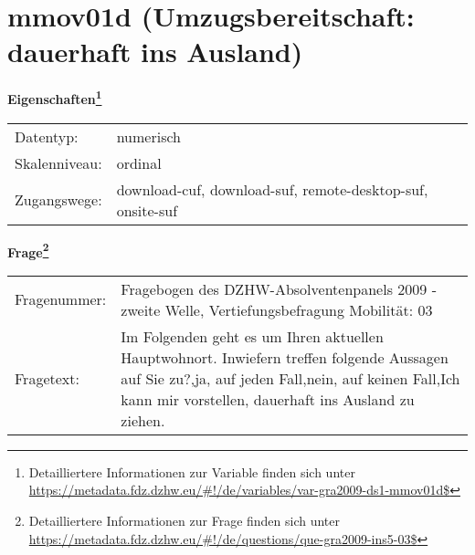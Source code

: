 
    \setcounter{footnote}{0}

    \vspace*{-1.8cm}
	\section{mmov01d (Umzugsbereitschaft: dauerhaft ins Ausland)}
	\label{section:mmov01d}



    \vspace*{0.5cm}
    \noindent\textbf{Eigenschaften\footnote{Detailliertere Informationen zur Variable finden sich unter
		\url{https://metadata.fdz.dzhw.eu/\#!/de/variables/var-gra2009-ds1-mmov01d$}}}\\
	\begin{tabularx}{\hsize}{@{}lX}
	Datentyp: & numerisch \\
	Skalenniveau: & ordinal \\
	Zugangswege: &
	  download-cuf, 
	  download-suf, 
	  remote-desktop-suf, 
	  onsite-suf
 \\
    \end{tabularx}



				\vspace*{0.5cm}
                \noindent\textbf{Frage\footnote{Detailliertere Informationen zur Frage finden sich unter
		              \url{https://metadata.fdz.dzhw.eu/\#!/de/questions/que-gra2009-ins5-03$}}}\\
				\begin{tabularx}{\hsize}{@{}lX}
					Fragenummer: &
					  Fragebogen des DZHW-Absolventenpanels 2009 - zweite Welle, Vertiefungsbefragung Mobilität:
					  03
 \\
					Fragetext: & Im Folgenden geht es um Ihren aktuellen Hauptwohnort. Inwiefern treffen folgende Aussagen auf Sie zu?,ja, auf jeden Fall,nein, auf keinen Fall,Ich kann mir vorstellen, dauerhaft ins Ausland zu ziehen. \\
				\end{tabularx}





